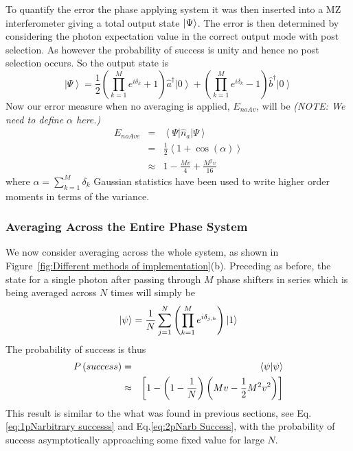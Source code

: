 \documentclass[aps,pra,twocolumn,superscriptaddress,numerical,floatfix]{revtex4-1}
\begin{document}
To quantify the error the phase applying system it was then inserted into a MZ interferometer giving a total output state $\ket{\Psi}$. The error is then determined by considering the photon expectation value in the correct output mode with post selection. As however the probability of success is unity and hence no post selection occurs. So the output state is
\begin{equation}
\left|\Psi\right\rangle =\frac{1}{2}\left(\prod_{k=1}^{M}e^{i\delta_{k}}+1\right)\hat{a}^{\dagger}\left|0\right\rangle +\left(\prod_{k=1}^{M}e^{i\delta_{k}}-1\right)\hat{b}^{\dagger}\left|0\right\rangle \label{eq:noAveIntState}
\end{equation}
Now our error measure when no averaging is applied, $E_{noAv}$, will be
\emph{(NOTE: We need to define $\alpha$ here.)}
\begin{eqnarray}
E_{noAve} & = & \left\langle \Psi\right|\hat{n}_{a}\left|\Psi\right\rangle \nonumber \\
& = & \frac{1}{2}\left\langle 1+\cos\left(\alpha\right)\right\rangle \nonumber \\
& \approx & 1-\frac{Mv}{4}+\frac{M^{2}v}{16}\label{eq:ErrorNoAv1}
\end{eqnarray}
where $\alpha=\sum_{k=1}^{M}\delta_{k}$ Gaussian statistics have been used to write higher order moments in terms of the variance.

\subsubsection{Averaging Across the Entire Phase System\label{Averaging Across the Entire Phase System}}

We now consider averaging across the whole system, as shown in Figure~\ref{fig:Different methods of implementation}(b). Preceding as before, the state for a single photon after passing through $M$ phase shifters in series which is being averaged across $N$ times will simply be
\begin{equation}
	\ket{\psi}=\frac{1}{N}\sum_{j=1}^{N}\left(\prod_{k=1}^{M}e^{i\delta_{j,k}}\right)\ket{1} \label{eq:AvEndPhaseState}
\end{equation}
The probability of success is thus
\begin{eqnarray}
	P\left(success\right) & = & \braket{\psi|\psi} \nonumber \\
& \approx & \left[1-\left(1-\frac{1}{N}\right)\left(Mv-\frac{1}{2}M^{2}v^{2}\right)\right]\label{eq:AveEndProbSuccess}
\end{eqnarray}
This result is similar to the what was found in previous sections, see Eq.\ref{eq:1pNarbitrary successs} and Eq.\ref{eq:2pNarb Success}, with the probability of success asymptotically approaching some fixed value for large $N$.
\end{document}
